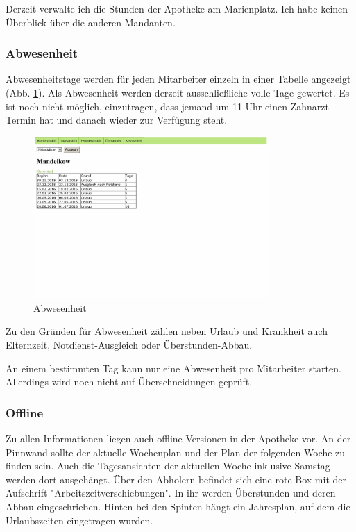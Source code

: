 \documentclass[10pt,a4paper,titlepage,oneside]{article}
\begin{document}
Derzeit verwalte ich die Stunden der Apotheke am Marienplatz. Ich habe keinen Überblick über die anderen Mandanten.


\subsubsection{Abwesenheit}
Abwesenheitstage werden für jeden Mitarbeiter einzeln in einer Tabelle angezeigt (Abb. \ref{fig:Abwesenheit}).
Als Abwesenheit werden derzeit ausschließliche volle Tage gewertet. Es ist noch nicht möglich, einzutragen, dass jemand um 11 Uhr einen Zahnarzt-Termin hat und danach wieder zur Verfügung steht.

\begin{figure}[h]
\centering
\includegraphics[width=0.8\textwidth]{abwesenheit-out}
\caption{Abwesenheit}
\label{fig:Abwesenheit}
\end{figure}

Zu den Gründen für Abwesenheit zählen neben Urlaub und Krankheit auch Elternzeit, Notdienst-Ausgleich oder Überstunden-Abbau.

An einem bestimmten Tag kann nur eine Abwesenheit pro Mitarbeiter starten. Allerdings wird noch nicht auf Überschneidungen geprüft.




\subsubsection{Offline}
Zu allen Informationen liegen auch offline Versionen in der Apotheke vor.
An der Pinnwand sollte der aktuelle Wochenplan und der Plan der folgenden Woche zu finden sein. Auch die Tagesansichten der aktuellen Woche inklusive Samstag werden dort ausgehängt. Über den Abholern befindet sich eine rote Box mit der Aufschrift "Arbeitszeitverschiebungen". In ihr werden Überstunden und deren Abbau eingeschrieben.
Hinten bei den Spinten hängt ein Jahresplan, auf dem die Urlaubszeiten eingetragen wurden.
\end{document}
